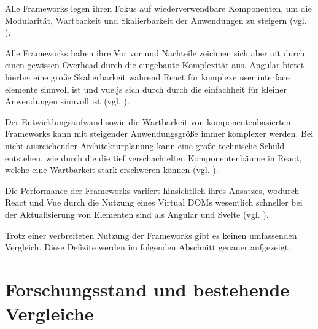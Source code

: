 \documentclass[oneside]{ausarbeitung}
\begin{document}
Alle Frameworks legen ihren Fokus auf wiederverwendbare Komponenten, um die Modularität, Wartbarkeit und Skalierbarkeit der Anwendungen zu steigern (vgl. \autocite [S. 7]{spa-frameworks-2024}). 

Alle Frameworks haben ihre Vor vor und Nachteile zeichnen sich aber oft durch einen gewissen Overhead durch die eingebaute Komplexität aus. Angular bietet hierbei eine große Skalierbarkeit während React für komplexe user interface elemente sinnvoll ist und vue.js sich durch durch die einfachheit für kleiner Anwendungen sinnvoll ist (vgl. \parencite[S. 4]{frontend-frameworks-comparison}). 

Der Entwicklungsaufwand sowie die Wartbarkeit von komponentenbasierten Frameworks kann mit steigender Anwendungsgröße immer komplexer werden. Bei nicht ausreichender Architekturplanung kann eine große technische Schuld entstehen, wie durch die die tief verschachtelten Komponentenbäume in React, welche eine Wartbarkeit stark erschweren können (vgl. \parencite[S. 29]{comparison-frameworks-scalable-apps}).

Die Performance der Frameworks variiert hinsichtlich ihres Ansatzes, wodurch React und Vue durch die Nutzung eines Virtual DOMs wesentlich schneller bei der Aktualisierung von Elementen sind als Angular und Svelte (vgl. \parencite[S. 61]{js-framework-comparison}).

Trotz einer verbreiteten Nutzung der Frameworks gibt es keinen umfassenden Vergleich. Diese Defizite werden im folgenden Abschnitt genauer aufgezeigt. 

\section{Forschungsstand und bestehende Vergleiche}
\end{document}

